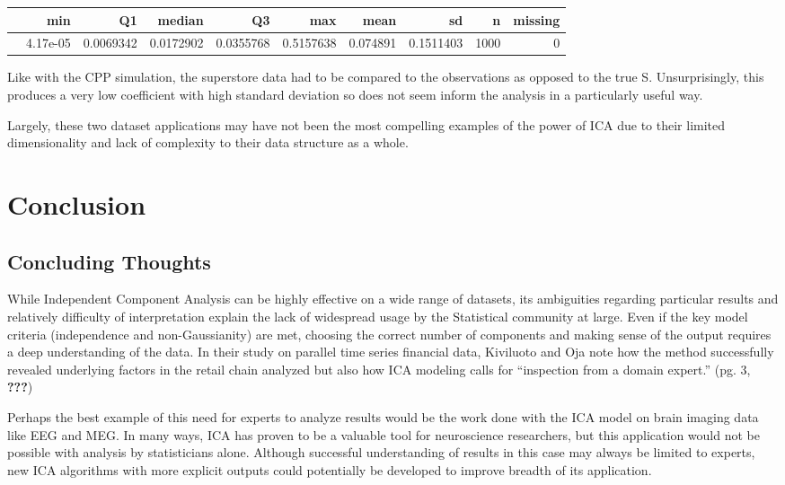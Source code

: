 \documentclass[12pt,twoside]{amherstthesis}
\begin{document}
  \begin{longtable}[]{@{}lrrrrrrrrr@{}}
  \toprule
  & min & Q1 & median & Q3 & max & mean & sd & n & missing\tabularnewline
  \midrule
  \endhead
  & 4.17e-05 & 0.0069342 & 0.0172902 & 0.0355768 & 0.5157638 & 0.074891 &
  0.1511403 & 1000 & 0\tabularnewline
  \bottomrule
  \end{longtable}
  
  Like with the CPP simulation, the superstore data had to be compared to
  the observations as opposed to the true S. Unsurprisingly, this produces
  a very low coefficient with high standard deviation so does not seem
  inform the analysis in a particularly useful way.
  
  Largely, these two dataset applications may have not been the most
  compelling examples of the power of ICA due to their limited
  dimensionality and lack of complexity to their data structure as a
  whole.
  
  \chapter*{Conclusion}\label{conclusion}
  
  \setcounter{chapter}{4} \setcounter{section}{0}
  
  \section{Concluding Thoughts}\label{concluding-thoughts}
  
  While Independent Component Analysis can be highly effective on a wide
  range of datasets, its ambiguities regarding particular results and
  relatively difficulty of interpretation explain the lack of widespread
  usage by the Statistical community at large. Even if the key model
  criteria (independence and non-Gaussianity) are met, choosing the
  correct number of components and making sense of the output requires a
  deep understanding of the data. In their study on parallel time series
  financial data, Kiviluoto and Oja note how the method successfully
  revealed underlying factors in the retail chain analyzed but also how
  ICA modeling calls for ``inspection from a domain expert.'' (pg. 3,
  {\textbf{???}})
  
  Perhaps the best example of this need for experts to analyze results
  would be the work done with the ICA model on brain imaging data like EEG
  and MEG. In many ways, ICA has proven to be a valuable tool for
  neuroscience researchers, but this application would not be possible
  with analysis by statisticians alone. Although successful understanding
  of results in this case may always be limited to experts, new ICA
  algorithms with more explicit outputs could potentially be developed to
  improve breadth of its application.
  
\end{document}
